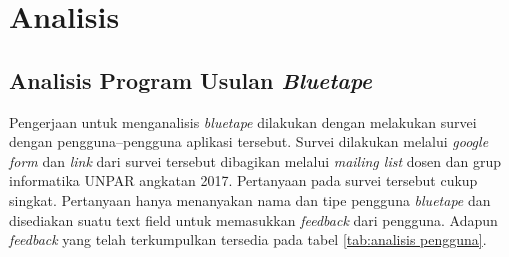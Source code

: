 \chapter{Analisis}
\section{Analisis Program Usulan \textit{Bluetape}}
Pengerjaan untuk menganalisis \textit{bluetape} dilakukan dengan melakukan survei dengan pengguna--pengguna aplikasi tersebut. Survei dilakukan melalui \textit{google form} dan \textit{link} dari survei tersebut dibagikan melalui \textit{mailing list} dosen dan grup informatika UNPAR angkatan 2017. Pertanyaan pada survei tersebut cukup singkat. Pertanyaan hanya menanyakan nama dan tipe pengguna \textit{bluetape} dan disediakan suatu text field untuk memasukkan \textit{feedback} dari pengguna. Adapun \textit{feedback} yang telah terkumpulkan tersedia pada tabel \ref{tab:analisis pengguna}.

